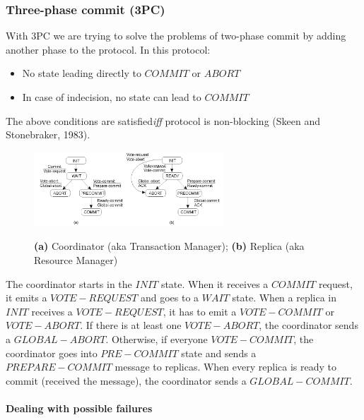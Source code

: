 \documentclass[10pt,a4paper]{article}
\newcommand{\myparagraph}[1]{\paragraph{#1}\mbox{}\\[0.05in]}
\begin{document}
\subsubsection{Three-phase commit (3PC)}
With 3PC we are trying to solve the problems of two-phase commit by adding another phase to the protocol. In this protocol:
\begin{itemize}
	\item No state leading directly to $COMMIT$ or $ABORT$
	\item In case of indecision, no state can lead to $COMMIT$
\end{itemize}
The above conditions are satisfied\textit{iff} protocol is non-blocking (Skeen and Stonebraker, 1983).
\begin{figure}[h!]
\hfill \includegraphics[width=200pt]{images/3pc.png}\hspace*{\fill}
  \label{fig:3pc}
  \caption{\textbf{(a)} Coordinator (aka Transaction Manager); \textbf{(b)} Replica (aka Resource Manager)}
\end{figure}
The coordinator starts in the $INIT$ state. When it receives a $COMMIT$ request, it emits a $VOTE-REQUEST$ and goes to a $WAIT$ state. When a replica in $INIT$ receives a $VOTE-REQUEST$, it has to emit a $VOTE-COMMIT$ or $VOTE-ABORT$. If there is at least one $VOTE-ABORT$, the coordinator sends a $GLOBAL-ABORT$. Otherwise, if everyone $VOTE-COMMIT$, the coordinator goes into $PRE-COMMIT$ state and sends a $PREPARE-COMMIT$ message to replicas. When every replica is ready to commit (received the message), the coordinator sends a $GLOBAL-COMMIT$.
\myparagraph{Dealing with possible failures}
\end{document}

